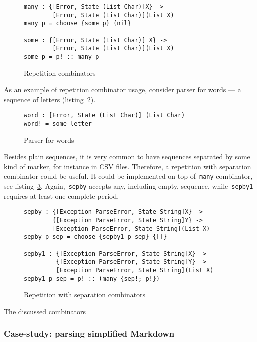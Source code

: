     \begin{figure}[h]
    \begin{lstlisting}
many : {[Error, State (List Char)]X} ->
        [Error, State (List Char)](List X)
many p = choose {some p} {nil}

some : {[Error, State (List Char)] X} ->
        [Error, State (List Char)](List X)
some p = p! :: many p
    \end{lstlisting}
    \caption{Repetition combinators}
    \label{listing:parserManyCombo}
    \end{figure}

    As an example of repetition combinator usage, consider parser for words ---
    a sequence of letters (listing~\ref{listing:parserWordCombo}).

    \begin{figure}[h]
    \begin{lstlisting}
word : [Error, State (List Char)] (List Char)
word! = some letter
    \end{lstlisting}
    \caption{Parser for words}
    \label{listing:parserWordCombo}
    \end{figure}

    Besides plain sequences, it is very common to have sequences separated by some
    kind of marker, for instance in CSV files. Therefore, a repetition with separation
    combinator could be useful. It could be implemented on top of~\texttt{many}
    combinator, see listing~\ref{listing:parserSepbyCombo}. Again,~\texttt{sepby}
    accepts any, including empty, sequence, while~\texttt{sepby1} requires at least
    one complete period.

    \begin{figure}[h]
    \begin{lstlisting}
sepby : {[Exception ParseError, State String]X} ->
        {[Exception ParseError, State String]Y} ->
        [Exception ParseError, State String](List X)
sepby p sep = choose {sepby1 p sep} {[]}

sepby1 : {[Exception ParseError, State String]X} ->
         {[Exception ParseError, State String]Y} ->
         [Exception ParseError, State String](List X)
sepby1 p sep = p! :: (many {sep!; p!})
    \end{lstlisting}
    \caption{Repetition with separation combinators}
    \label{listing:parserSepbyCombo}
    \end{figure}

    The discussed combinators

    \subsubsection{Case-study: parsing simplified Markdown}

